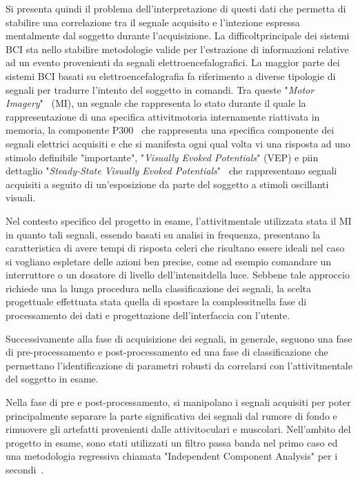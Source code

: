 \documentclass[a4paper]{article}
\begin{document}
Si presenta quindi il problema dell'interpretazione di questi dati che permetta di stabilire una correlazione tra il segnale acquisito e l'intezione espressa mentalmente dal soggetto durante l'acquisizione.
La difficolt\aacuto principale dei sistemi BCI sta nello stabilire metodologie valide per l'estrazione di informazioni relative ad un evento provenienti da segnali elettroencefalografici. La maggior parte dei sistemi BCI basati su elettroencefalografia fa riferimento a diverse tipologie di segnali per tradurre l'intento del soggetto in comandi. Tra queste "\textit{Motor Imagery}"~\cite{2009-Tho} (MI), un segnale che rappresenta lo stato durante il quale la rappresentazione di una specifica attivit\aacuto motoria \egrave internamente riattivata in memoria, la componente P300~\cite{2008-Len} che rappresenta una specifica componente dei segnali elettrici acquisiti e che si manifesta ogni qual volta vi \egrave una risposta ad uno stimolo definibile "importante", "\textit{Visually Evoked Potentials}" (VEP) e pi\uacuto in dettaglio "\textit{Steady-State Visually Evoked Potentials}"~\cite{2013-Xia} che rappresentano segnali acquisiti a seguito di un'esposizione da parte del soggetto a stimoli oscillanti visuali.

Nel contesto specifico del progetto in esame, l'attivit\aacuto mentale utilizzata \egrave stata il MI in quanto tali segnali, essendo basati su analisi in frequenza, presentano la caratteristica di avere tempi di risposta celeri che risultano essere ideali nel caso si vogliano espletare delle azioni ben precise, come ad esempio comandare un interruttore o un dosatore di livello dell'intensit\aacuto della luce.
Sebbene tale approccio richiede una la lunga procedura nella classificazione  dei segnali, la scelta progettuale effettuata \egrave stata quella di spostare la complessit\aacuto nella fase di processamento dei dati e progettazione dell'interfaccia con l'utente.

Successivamente alla fase di acquisizione dei segnali, in generale, seguono una fase di pre-processamento e post-processamento ed una fase di classificazione che permettano l'identificazione di parametri robusti da correlarsi con l'attivit\aacuto mentale del soggetto in esame.

Nella fase di pre e post-processamento, si manipolano i segnali acquisiti per poter principalmente separare la parte significativa dei segnali dal rumore di fondo e rimuovere gli artefatti provenienti dalle attivit\aacuto oculari e muscolari. Nell'ambito del progetto in esame, sono stati utilizzati un filtro passa banda nel primo caso ed una metodologia regressiva chiamata "Independent Component Analysis" per i secondi~\cite{2016-Dif}.
\end{document}

